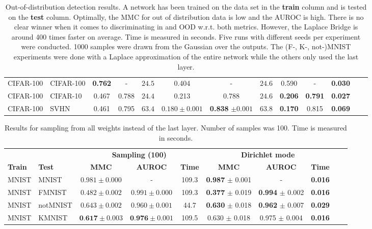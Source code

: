 \begin{table*}[h!]
{\begin{tabular}{l  l || c c c c  c  c  c  c c c c}
         \midrule
         CIFAR-100 & CIFAR-100 & \textbf{0.762} & -     & $24.5$ & 0.404            & -                 & $24.6$ & 0.590 & -     & \textbf{0.030} \\
         CIFAR-100 & CIFAR-10  & 0.467 & 0.788 & $24.4$ & 0.213            & 0.788             & $24.6$ & \textbf{0.206} & \textbf{0.791} & \textbf{0.027} \\
         CIFAR-100 & SVHN      & 0.461 & 0.795 & $63.4$ & $0.180 \pm0.001$ & \textbf{0.838} $\pm 0.001$ & $63.8$ & \textbf{0.170} & 0.815 & \textbf{0.069} \\
         \bottomrule
    \end{tabular}
	}
    \caption{Out-of-distribution detection results. A network has been trained on the data set in the \textbf{train} column and is tested on the \textbf{test} column. Optimally, the MMC for out of distribution data is low and the AUROC is high. There is no clear winner when it comes to discriminating in and OOD w.r.t. both metrics. However, the Laplace Bridge is around 400 times faster on average. Time is measured in seconds. Five runs with different seeds per experiment were conducted. 1000 samples were drawn from the Gaussian over the outputs. The (F-, K-, not-)MNIST experiments were done with a Laplace approximation of the entire network while the others only used the last layer.}
    \label{tab:experiments_table_KFAC_1000}
\end{table*}

\begin{table*}[h!]
	\scriptsize
    \centering
    \begin{tabular}{l  l || c  c  c  c  c c c c}
	     \toprule
         & & \multicolumn{3}{c}{\textbf{Sampling (100)}} &  \multicolumn{3}{c}{\textbf{Dirichlet mode}}\\
         \textbf{Train} & \textbf{Test} & \textbf{MMC} & \textbf{AUROC} & \textbf{Time} & \textbf{MMC} & \textbf{AUROC} &  \textbf{Time}\\
         \midrule
         MNIST & MNIST    & $0.981 \pm 0.000$ &  -    & 109.3 &  \textbf{0.987} $\pm$ 0.001 & - & \textbf{0.016} \\
         MNIST & FMNIST   & $0.482 \pm 0.002$ & $0.991 \pm 0.000$ & 109.3 &  \textbf{0.377} $\pm$ 0.019 & \textbf{0.994} $\pm$ 0.002 &  \textbf{0.016}\\
         MNIST & notMNIST & $0.643 \pm 0.002$ & $0.960 \pm 0.001$ & 44.7  &  \textbf{0.630} $\pm$ 0.018 & \textbf{0.962} $\pm$ 0.007 &  \textbf{0.029}\\
         MNIST & KMNIST   & $\textbf{0.617} \pm 0.003$ & $\textbf{0.976} \pm 0.001$ & 109.5 &  0.630 $\pm$ 0.018 & 0.975 $\pm$ 0.004 &  \textbf{0.016} \\
         \bottomrule
    \end{tabular}
    \caption{Results for sampling from all weights instead of the last layer. Number of samples was 100. Time is measured in seconds.}
    \label{tab:experiments_table_sample_full}
\end{table*}

